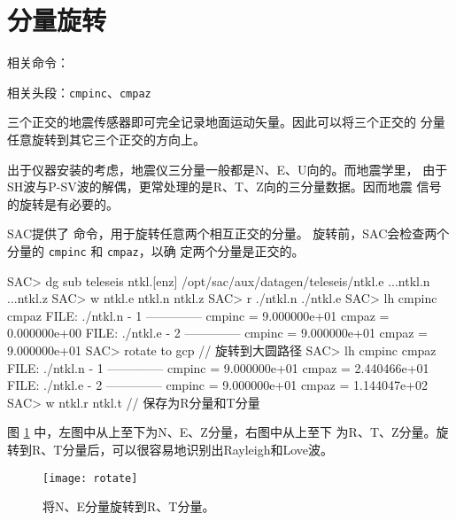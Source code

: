 \section{分量旋转}
\label{sec:traces-rotating}
相关命令：

相关头段：\texttt{cmpinc}、\texttt{cmpaz}

三个正交的地震传感器即可完全记录地面运动矢量。因此可以将三个正交的
分量任意旋转到其它三个正交的方向上。

出于仪器安装的考虑，地震仪三分量一般都是N、E、U向的。而地震学里，
由于SH波与P-SV波的解偶，更常处理的是R、T、Z向的三分量数据。因而地震
信号的旋转是有必要的。

SAC提供了  命令，用于旋转任意两个相互正交的分量。
旋转前，SAC会检查两个分量的 \texttt{cmpinc} 和 \texttt{cmpaz}，以确
定两个分量是正交的。

\begin{SACCode}
SAC> dg sub teleseis ntkl.[enz]
/opt/sac/aux/datagen/teleseis/ntkl.e ...ntkl.n ...ntkl.z
SAC> w ntkl.e ntkl.n ntkl.z
SAC> r ./ntkl.n ./ntkl.e
SAC> lh cmpinc cmpaz
  FILE: ./ntkl.n - 1
 --------------
     cmpinc = 9.000000e+01
      cmpaz = 0.000000e+00
  FILE: ./ntkl.e - 2
 --------------
     cmpinc = 9.000000e+01
      cmpaz = 9.000000e+01
SAC> rotate to gcp              // 旋转到大圆路径
SAC> lh cmpinc cmpaz
  FILE: ./ntkl.n - 1
 --------------
     cmpinc = 9.000000e+01
      cmpaz = 2.440466e+01
  FILE: ./ntkl.e - 2
 --------------
     cmpinc = 9.000000e+01
      cmpaz = 1.144047e+02
SAC> w ntkl.r ntkl.t            // 保存为R分量和T分量
\end{SACCode}

图 \ref{fig:rotate} 中，左图中从上至下为N、E、Z分量，右图中从上至下
为R、T、Z分量。旋转到R、T分量后，可以很容易地识别出Rayleigh和Love波。

\begin{figure}[H]
\centering
\texttt{[image: rotate]}
\caption[水平分量旋转]{将N、E分量旋转到R、T分量。}
\label{fig:rotate}
\end{figure}
